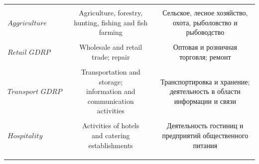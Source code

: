 \documentclass[12pt]{article}
\numberwithin{equation}{section}
\numberwithin{table}{section}
\numberwithin{figure}{section}
\begin{document}
\begin{table}[!h]
\begin{tabular}{@{\extracolsep{5pt}}lcc}
  & & \\ 
 $\textit{Aggriculture GDRP}$ & \makecell[c]{Agriculture, forestry, \\hunting, fishing and fish farming} &\makecell[c]{Сельское, лесное хозяйство, \\ охота, рыболовство и \\ рыбоводство}  \\ 
  & &  \\ 
 $\textit{Retail GDRP}$ & \makecell[c]{Wholesale and retail\\  trade; repair} &\makecell[c]{Оптовая и розничная\\ торговля; ремонт}\\ 
  & &  \\ 
 $\textit{Transport GDRP}$ & 
 \makecell[c]{Transportation and storage; \\information and communication \\ activities}&  \makecell[c]{Транспортировка и хранение;\\ деятельность в области\\ информации и связи}\\ 
  & &  \\ 
 $\textit{Hospitality GDRP}$&\makecell[c]{Activities of hotels \\ and catering establishments}& \makecell[c]{Деятельность гостиниц и \\предприятий общественного питания}\\ 
  & &  \\ 
 \\[-1.8ex]\hline 
 \hline \\[-1.8ex] 
  \end{tabular}
\end{table}
\end{document}
